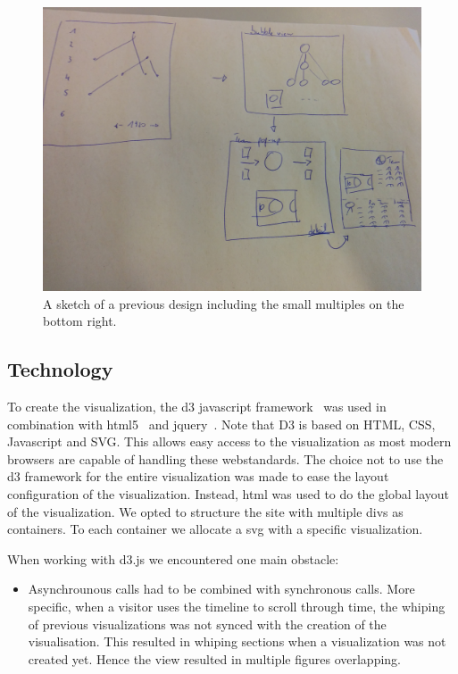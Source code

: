\documentclass[]{sigchi}
\begin{document}
\begin{figure}
\centering
  \includegraphics[width=1.0\columnwidth]{figures/smallmultsketch}
  \caption{A sketch of a previous design including the small multiples on the
  bottom right.}
  \label{fig:smallmultsktech}
\end{figure}

\subsection{Technology}
To create the visualization, the d3 javascript framework~\cite{d3} was used in
combination with html5~\cite{html5} and jquery~\cite{jquery}. Note that D3 is
based on HTML, CSS, Javascript and SVG. This allows easy access to the
visualization as most modern browsers are capable of handling these
webstandards. The choice not to use the d3 framework for the entire
visualization was made to ease the layout configuration of the visualization.
Instead, html was used to do the global layout of the visualization. We opted to
structure the site with multiple divs as containers. To each container we
allocate a svg with a specific visualization.

When working with d3.js we encountered one main obstacle:
\begin{itemize}
        \item Asynchrounous calls had to be combined with synchronous calls.
            More specific, when a visitor uses the timeline to scroll through
            time, the whiping of previous visualizations was not synced with the
            creation of the visualisation. This resulted in whiping sections
            when a visualization was not created yet. Hence the view resulted in
            multiple figures overlapping.
\end{itemize}
\end{document}
